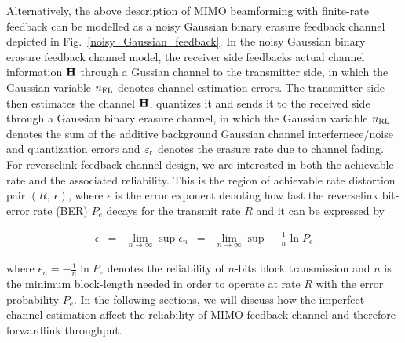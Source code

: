 \documentclass[10pt,fleqn, twocolumn]{IEEEtran}
\newcommand{\bH}{{\bf H}}
\begin{document}
\begin{figure}
\end{figure}

Alternatively, the above description of MIMO beamforming with
finite-rate feedback can be modelled as a noisy Gaussian binary
erasure feedback channel depicted in
Fig.~\ref{noisy_Gaussian_feedback}. In the noisy Gaussian binary
erasure feedback channel model, the receiver side feedbacks actual
channel information $\bH$ through a Gussian channel to the
transmitter side, in which the Gaussian variable $n_{\rm FL}$
denotes channel estimation errors.  The transmitter side then
estimates the channel $\bH$, quantizes it and sends it to the
received side through a Gaussian binary erasure channel, in which
the Gaussian variable $n_{\rm RL}$ denotes the sum of the additive
background Gaussian channel interfernece/noise and quantization
errors and $\varepsilon_{\rm r}$ denotes the erasure rate due to
channel fading. For reverselink feedback channel design, we are
interested in both the achievable rate and the associated
reliability. This is the region of achievable rate distortion pair
$\left(R,\ \epsilon\right)$, where $\epsilon$ is the error
exponent denoting how fast the reverselink bit-error rate (BER)
$P_{e}$ decays for the transmit rate $R$ and it can be expressed
by

\begin{equation}
\begin{array}{rcccl}
\epsilon&=&\lim\limits_{n\rightarrow\infty}\sup
\epsilon_{n}&=&\lim\limits_{n\rightarrow\infty}\sup-\frac{1}{n}\ln
P_{e}
\end{array}
\end{equation}

\noindent where $\epsilon_{n}=-\frac{1}{n}\ln P_{e}$ denotes the
reliability of $n$-bits block transmission and $n$ is the minimum
block-length needed in order to operate at rate $R$ with the error
probability $P_{e}$. In the following sections, we will discuss
how the imperfect channel estimation affect the reliability of
MIMO feedback channel and therefore forwardlink throughput.
\end{document}
